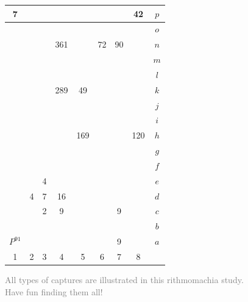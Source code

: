 \documentclass[12pt]{article}
\begin{document}
\begin{figure}[h!] 
\centering 
\begin{tabular}{|c|c|c|c|c|c|c|c||c} \hline
\circletfill{\,}7 & \quad  & \quad  & \quad  & \quad  & \quad  & \quad  & \trianglepa{\,}42 & $p$ \\ \hline
\quad  & \quad  & \quad  & \quad  & \quad  & \quad  & \quad  & \quad  & $o$ \\ \hline
\quad  & \quad  & \quad  & \squadfill{\,}361 & \quad  & \trianglepa{\,}72 & \trianglepafill{\,}90 & \quad  & $n$ \\ \hline
\quad  & \quad  & \quad  & \quad  & \quad  & \quad  & \quad  & \quad  & $m$ \\ \hline
\quad  & \quad  & \quad  & \quad  & \quad  & \quad  & \quad  & \quad  & $l$ \\ \hline
\quad  & \quad  & \quad  & \squad{\,}289 & \squadfill{\,}49 & \quad  & \quad  & \quad  & $k$ \\ \hline
\quad  & \quad  & \quad  & \quad  & \quad  & \quad  & \quad  & \quad  & $j$ \\ \hline
\quad  & \quad  & \quad  & \quad  & \quad  & \quad  & \quad  & \quad  & $i$ \\ \hline
\quad  & \quad  & \quad  & \quad  & \squad{\,}169 & \quad  & \quad  & \squadfill{\,}120 & $h$ \\ \hline
\quad  & \quad  & \quad  & \quad  & \quad  & \quad  & \quad  & \quad  & $g$ \\ \hline
\quad  & \quad  & \quad  & \quad  & \quad  & \quad  & \quad  & \quad  & $f$ \\ \hline
\quad  & \quad  & \circlet{\,}4 & \quad  & \quad  & \quad  & \quad  & \quad  & $e$ \\ \hline
\quad  & \circlet{\,}4 & \circletfill{\,}7 & \circlet{\,}16 & \quad  & \quad  & \quad  & \quad  & $d$ \\ \hline
\quad  & \quad  & \circlet{\,}2 & \circletfill{\,}9 & \quad  & \quad  & \trianglepa{\,}9 & \quad  & $c$ \\ \hline
\quad  & \quad  & \quad  & \quad  & \quad  & \quad  & \quad  & \quad  & $b$ \\ \hline
\rhombus{\,}$P^{91}$ & \quad  & \quad  & \quad  & \quad  & \quad  & \circletfill{\,}9 & \quad  & $a$ \\ \hline
1 &  2 &  3 &  4 &  5 &  6 &  7 &  8  &  \\
\end{tabular}
\caption{\textcolor{gray}{All types of captures are illustrated in this rithmomachia study. Have fun finding them all! }}
\label{fig:rithmomachia-numerous-captures-with-pyramid} 
\end{figure}
\end{document}
